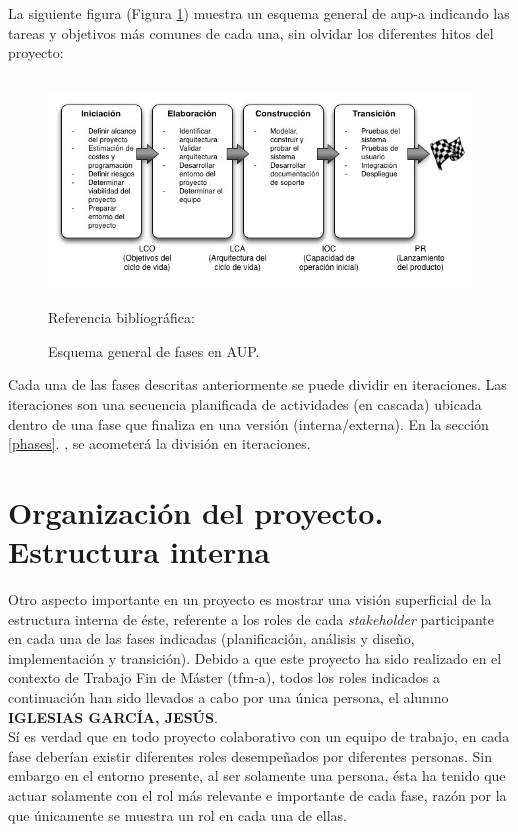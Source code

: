 \documentclass[12pt,a4paper, twoside]{report}
\newcommand{\jesus}{IGLESIAS GARCÍA, JESÚS}
\begin{document}
	La siguiente figura (Figura \ref{fig:plannig-aup-scheme}) muestra un esquema general de \gls{aup-a} indicando las tareas y objetivos más comunes de cada una, sin olvidar los diferentes hitos del proyecto:
	
	\begin{figure}[!ht]   
		\caption{Esquema general de fases en AUP.} 
		\begin{center} 
	 		\includegraphics[width=15cm,height=6cm]{Images/planning/aup} \\
			\label{fig:plannig-aup-scheme} 
			Referencia bibliográfica: \cite{torrecilla:PUA}
		\end{center}  
	\end{figure}
	
	Cada una de las fases descritas anteriormente se puede dividir en iteraciones. Las iteraciones son una secuencia planificada de actividades (en cascada) ubicada dentro de una fase que finaliza en una versión (interna/externa). En la sección \ref{phases}. , se acometerá la división en iteraciones.			
			
	\section{Organización del proyecto. Estructura interna}

	Otro aspecto importante en un proyecto es mostrar una visión superficial de la estructura interna de éste, referente a los roles de cada \textit{\gls{stakeholder}} participante en cada una de las fases indicadas (planificación, análisis y diseño, implementación y transición). Debido a que este proyecto ha sido realizado en el contexto de Trabajo Fin de Máster (\gls{tfm-a}), todos los roles indicados a continuación han sido llevados a cabo por una única persona, el alumno \textbf{\jesus}. \\
	
	Sí es verdad que en todo proyecto colaborativo con un equipo de trabajo, en cada fase deberían existir diferentes roles desempeñados por diferentes personas. Sin embargo en el entorno presente, al ser solamente una persona, ésta ha tenido que actuar solamente con el rol más relevante e importante de cada fase, razón por la que únicamente se muestra un rol en cada una de ellas. \\
	
\end{document}
